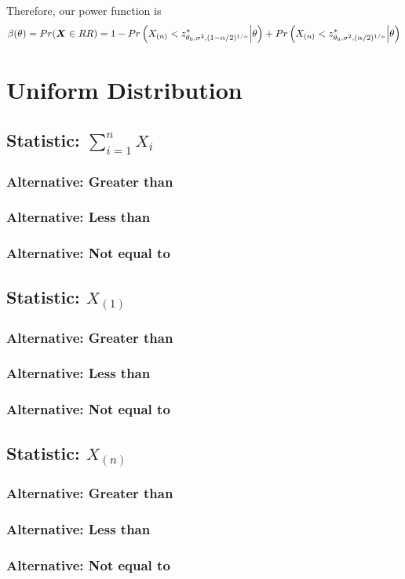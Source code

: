 \documentclass[]{article}
\newcommand{\bfX}{\mbox{\boldmath $X$}}
\begin{document}
Therefore, our power function is
\[
\beta(\theta) = Pr(\bfX \in RR) = 1 - Pr\left(X_{(n)} < z^*_{\theta_0, \sigma^2, (1 - \alpha/2)^{1/n}} \Big| \theta\right) + Pr\left(X_{(n)} < z^*_{\theta_0, \sigma^2, (\alpha/2)^{1/n}} \Big| \theta\right)
\]

\section{Uniform Distribution}

\subsection{Statistic: $\sum_{i=1}^n X_i$}

\subsubsection{Alternative: Greater than}

\subsubsection{Alternative: Less than}

\subsubsection{Alternative: Not equal to}

\subsection{Statistic: $X_{(1)}$}

\subsubsection{Alternative: Greater than}

\subsubsection{Alternative: Less than}

\subsubsection{Alternative: Not equal to}

\subsection{Statistic: $X_{(n)}$}

\subsubsection{Alternative: Greater than}

\subsubsection{Alternative: Less than}

\subsubsection{Alternative: Not equal to}
\end{document}
